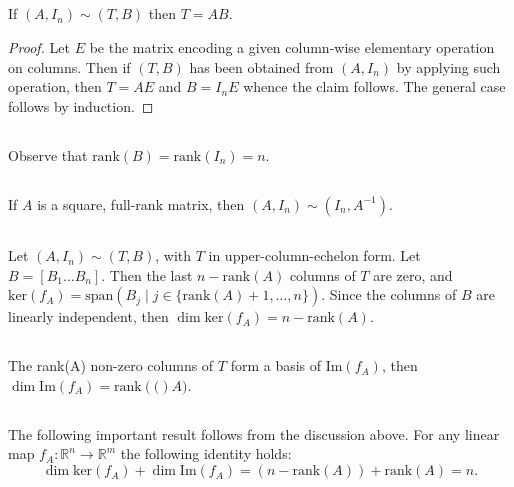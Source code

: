 \documentclass{proc-l}
\theoremstyle{definition}
\theoremstyle{remark}
\numberwithin{equation}{section}
\newcommand{\R}{\mathbb{R}}
\newcommand{\rank}[1]{\textrm{rank}({#1})}
\newcommand{\im}[1]{\textrm{Im}({#1})}
\renewcommand{\ker}[1]{\textrm{ker}({#1})}
\begin{document}
\subsection{}
If $(A, I_n) \sim (T, B)$ then $T=AB$.
\begin{proof}
Let $E$ be the matrix encoding a given column-wise elementary operation on columns. Then if $(T, B)$ has been obtained from $(A, I_n)$ by applying such operation, then $T=AE$ and $B=I_n E$ whence the claim follows. The general case follows by induction.
\end{proof}

\subsection{}
Observe that $\rank{B} = \rank{I_n} = n$.

\subsection{}
If $A$ is a square, full-rank matrix, then $(A, I_n) \sim (I_n, A^{-1})$.

\subsection{}
Let $(A, I_n) \sim (T, B)$, with $T$ in upper-column-echelon form. Let $B=[B_1 \ldots B_n]$. Then the last $n - \rank{A}$ columns of $T$ are zero, and $\ker{f_A}=\textrm{span}\left(B_j \;|\; j\in\{ \rank{A} + 1, \ldots, n\}\right)$. Since the columns of $B$ are linearly independent, then $\dim{\ker{f_A}} = n - \rank{A}$.

\subsection{}
The \rank{A} non-zero columns of $T$ form a basis of $\im{f_A}$, then $\dim{\im{f_A}} = \rank(A)$.

\subsection{}
The following important result follows from the discussion above. For any linear map $f_A:\R^n\to\R^m$ the following identity holds:
\[
\dim{\ker{f_A}} + \dim{\im{f_A}} = (n - \rank{A}) + \rank{A} = n.
\]



\end{document}

